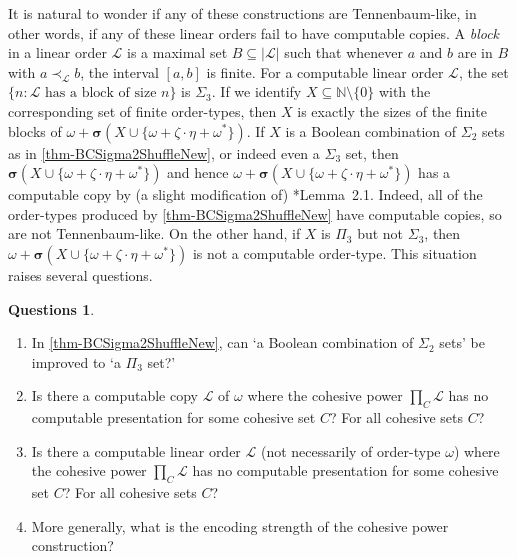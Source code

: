 \documentclass[11pt,a4paper,reqno]{amsart}
\theoremstyle{definition}
\newtheorem*{Questions*}{Questions}
\newcommand{\Nb}{\mathbb{N}}
\newcommand{\mc}[1]{\mathcal{#1}}
\begin{document}
It is natural to wonder if any of these constructions are Tennenbaum-like, in other words, if any of these linear orders fail to have computable copies.  A \emph{block} in a linear order $\mc{L}$ is a maximal set $B \subseteq |\mc{L}|$ such that whenever $a$ and $b$ are in $B$ with $a \prec_\mc{L} b$, the interval $[a, b]$ is finite.  For a computable linear order $\mc{L}$, the set $\{n : \text{$\mc{L}$ has a block of size $n$}\}$ is $\Sigma_3$.  If we identify $X \subseteq \Nb \setminus \{0\}$ with the corresponding set of finite order-types, then $X$ is exactly the sizes of the finite blocks of $\omega + \bm{\sigma}(X \cup \{\omega + \zeta\cdot\eta + \omega^*\})$.  If $X$ is a Boolean combination of $\Sigma_2$ sets as in \cref{thm-BCSigma2ShuffleNew}, or indeed even a $\Sigma_3$ set, then $\bm{\sigma}(X \cup \{\omega + \zeta\cdot\eta + \omega^*\})$ and hence $\omega + \bm{\sigma}(X \cup \{\omega + \zeta\cdot\eta + \omega^*\})$ has a computable copy by (a slight modification of) \cite{AshJockuschKnight}*{Lemma~2.1}.  Indeed, all of the order-types produced by \cref{thm-BCSigma2ShuffleNew} have computable copies, so are not Tennenbaum-like.  On the other hand, if $X$ is $\Pi_3$ but not $\Sigma_3$, then $\omega + \bm{\sigma}(X \cup \{\omega + \zeta\cdot\eta + \omega^*\})$ is not a computable order-type.  This situation raises several questions.

\begin{Questions*}\
\begin{enumerate}[(1)]
\item\label{q-Pi3} In \cref{thm-BCSigma2ShuffleNew}, can `a Boolean combination of $\Sigma_2$ sets' be improved to `a $\Pi_3$ set?'

\medskip

\item\label{q-omega} Is there a computable copy $\mc{L}$ of $\omega$ where the cohesive power $\prod_C \mc{L}$ has no computable presentation for some cohesive set $C$?  For all cohesive sets $C$?

\medskip

\item\label{q-lo} Is there a computable linear order $\mc{L}$ (not necessarily of order-type $\omega$) where the cohesive power $\prod_C \mc{L}$ has no computable presentation for some cohesive set $C$?  For all cohesive sets $C$?

\medskip

\item\label{q-enc} More generally, what is the encoding strength of the cohesive power construction?
\end{enumerate}
\end{Questions*}
\end{document}
